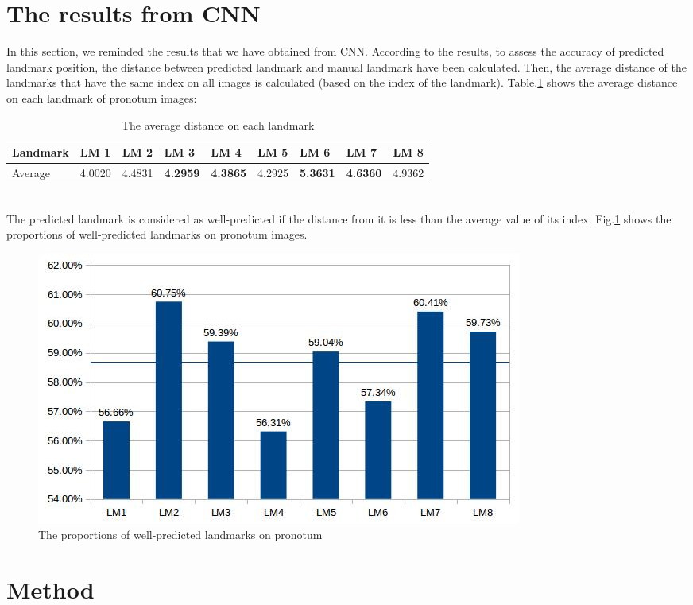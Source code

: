 \documentclass[12pt,a4paper]{article}
\begin{document}
\section{The results from CNN}
In this section, we reminded the results that we have obtained from CNN. According to the results, to assess the accuracy of predicted landmark position, the distance between predicted landmark and manual landmark have been calculated. Then, the average distance of the landmarks that have the same index on all images is calculated (based on the index of the landmark). Table.\ref{avgdistance1} shows the average distance on each landmark of pronotum images:\\
\begin{table}[h!]
	\centering
	\begin{tabular}{l l l l l l l l l}
	 Landmark& LM 1 & LM 2 & \textbf{LM 3} & \textbf{LM 4} & LM 5 & \textbf{LM 6} & \textbf{LM 7} & LM 8 \\ \hline
 	 Average & 4.0020 &	4.4831 & \textbf{4.2959} & \textbf{4.3865} &	 4.2925 & \textbf{5.3631} & \textbf{4.6360} &	4.9362
 \\ \hline
	\end{tabular}
	\caption{The average distance on each landmark }
	\label{avgdistance1}
\end{table}~\\
The predicted landmark is considered as well-predicted if the distance from it is less than the average value of its index. Fig.\ref{wellpredicted} shows the proportions of well-predicted landmarks on pronotum images.
\begin{figure}[h!]
	\centering
	\includegraphics[scale=0.5]{images/pronotum_avg_eval}
	\caption{The proportions of well-predicted landmarks on pronotum}
	\label{wellpredicted}
\end{figure}
\section{Method}
\end{document}
